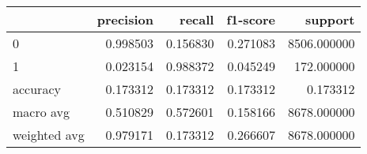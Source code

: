 \begin{tabular}{lrrrr}
\toprule
{} &  precision &    recall &  f1-score &      support \\
\midrule
0            &   0.998503 &  0.156830 &  0.271083 &  8506.000000 \\
1            &   0.023154 &  0.988372 &  0.045249 &   172.000000 \\
accuracy     &   0.173312 &  0.173312 &  0.173312 &     0.173312 \\
macro avg    &   0.510829 &  0.572601 &  0.158166 &  8678.000000 \\
weighted avg &   0.979171 &  0.173312 &  0.266607 &  8678.000000 \\
\bottomrule
\end{tabular}
